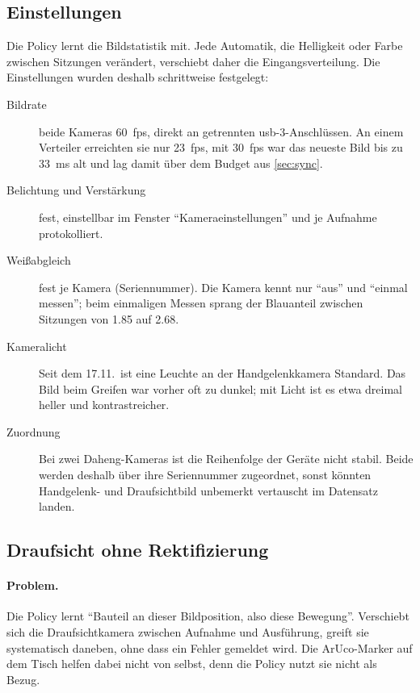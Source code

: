 \subsection{Einstellungen}

Die Policy lernt die Bildstatistik mit. Jede Automatik, die Helligkeit oder Farbe zwischen
Sitzungen verändert, verschiebt daher die Eingangsverteilung. Die Einstellungen wurden
deshalb schrittweise festgelegt:
\begin{description}
  \item[Bildrate] beide Kameras \SI{60}{fps}, direkt an getrennten \acs{usb}-3-Anschlüssen.
    An einem Verteiler erreichten sie nur \SI{23}{fps}, mit \SI{30}{fps} war das neueste Bild
    bis zu \SI{33}{\milli\second} alt und lag damit über dem Budget aus \cref{sec:sync}.
  \item[Belichtung und Verstärkung] fest, einstellbar im Fenster \enquote{Kameraeinstellungen}
    und je Aufnahme protokolliert.
  \item[Weißabgleich] fest je Kamera (Seriennummer). Die Kamera kennt nur \enquote{aus} und
    \enquote{einmal messen}; beim einmaligen Messen sprang der Blauanteil zwischen Sitzungen
    von \num{1.85} auf \num{2.68}.
  \item[Kameralicht] Seit dem 17.11.\ ist eine Leuchte an der Handgelenkkamera Standard. Das
    Bild beim Greifen war vorher oft zu dunkel; mit Licht ist es etwa dreimal heller und
    kontrastreicher.
  \item[Zuordnung] Bei zwei Daheng-Kameras ist die Reihenfolge der Geräte nicht stabil. Beide
    werden deshalb über ihre Seriennummer zugeordnet, sonst könnten Handgelenk- und
    Draufsichtbild unbemerkt vertauscht im Datensatz landen.
\end{description}

\subsection{Draufsicht ohne Rektifizierung}

\paragraph{Problem.} Die Policy lernt \enquote{Bauteil an dieser Bildposition, also diese
Bewegung}. Verschiebt sich die Draufsichtkamera zwischen Aufnahme und Ausführung, greift sie
systematisch daneben, ohne dass ein Fehler gemeldet wird. Die ArUco-Marker auf dem Tisch
helfen dabei nicht von selbst, denn die Policy nutzt sie nicht als Bezug.

